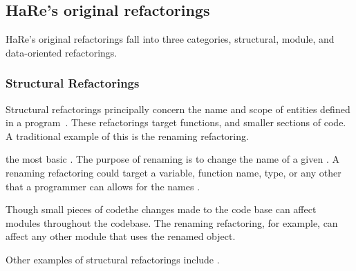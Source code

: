 \subsection{HaRe's original refactorings}\label{origRefactorings}

HaRe's original refactorings fall into three categories, structural, module, and data-oriented refactorings.

\subsubsection{Structural Refactorings}

Structural refactorings principally concern the name and scope of entities defined in a program~\citep{huiqingThesis}. These refactorings target functions, and smaller sections of code.  A traditional example of this is the renaming refactoring. \DIFdelbegin %

\DIFdelend \DIFaddbegin {}\DIFaddend the most basic \DIFdelbegin {}\DIFdelend \DIFaddbegin {}\DIFaddend . The purpose of renaming is to change the name of a given \DIFdelbegin {}\DIFdelend \DIFaddbegin {}\DIFaddend . A renaming refactoring could target a variable, function name, type, or any other \DIFdelbegin {}\DIFdelend \DIFaddbegin {}\DIFaddend that a programmer can \DIFdelbegin {}\DIFdelend \DIFaddbegin {}\DIFaddend allows for the names \DIFdelbegin {}\DIFdelend \DIFaddbegin {}\DIFaddend . 

Though \DIFdelbegin {}\DIFdelend \DIFaddbegin {}\DIFaddend small pieces of code\DIFaddbegin \DIFadd{, }\DIFaddend the changes made to the code base can affect modules throughout the codebase. The renaming refactoring, for example, can affect any other module that uses the renamed object.

Other examples of structural refactorings include \DIFdelbegin {}\DIFdelend \DIFaddbegin {}\DIFaddend .

